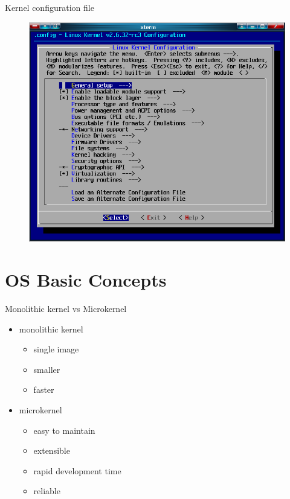 \documentclass{workshop}
\begin{document}
\begin{frame}{Kernel configuration file}

\begin{figure}
  \includegraphics[scale=0.4]{img/Linux-kernel-menuconfig.png}
\end{figure}
\end{frame}

\section{OS Basic Concepts}

\begin{frame}{Monolithic kernel vs Microkernel}
	\begin{itemize}
	\item monolithic kernel
    	\begin{itemize}
	\item single image
	\item smaller
	\item faster
	\end{itemize}
	\item microkernel
	\begin{itemize}
	\item easy to maintain
	\item extensible
	\item rapid development time
	\item reliable
	\end{itemize}
	\end{itemize}
\end{frame}
\end{document}
